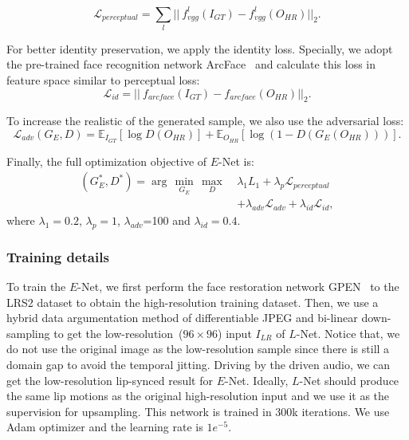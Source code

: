 \begin{equation}
\mathcal{L}_{perceptual} = \sum_l \vert\vert\ f_{vgg}^l(I_{GT}) - f_{vgg}^l(O_{HR})\vert\vert_2.
\end{equation}

For better identity preservation, we apply the identity loss. Specially, we adopt the pre-trained face recognition network ArcFace~\cite{deng2019arcface} and calculate this loss in feature space similar to perceptual loss:
\begin{equation}
\mathcal{L}_{id} = \vert\vert\ f_{arcface}(I_{GT}) - f_{arcface}(O_{HR})\vert\vert_2.
\end{equation}

To increase the realistic of the generated sample, we also use the adversarial loss:
\begin{equation}
\mathcal{L}_{adv}(G_E,D) = \mathbb{E}_{I_{GT}}[\log D(O_{HR})] + \mathbb{E}_{O_{HR}}[\log (1-D(G_E(O_{HR})))].
\end{equation}

Finally, the full optimization objective of $E$-Net is:
\begin{equation}
\begin{aligned}
(G^*_E, D^*) = \arg\,\min_{G_E}\,\max_D\ & \lambda_{1} L_{1} + \lambda_{p} \mathcal{L}_{perceptual} \\
&+ \lambda_{adv} \mathcal{L}_{adv} + \lambda_{id} \mathcal{L}_{id},
\end{aligned}
\end{equation}
\noindent where $\lambda_{1}=0.2$, $\lambda_{p}=1$, $\lambda_{adv}$=100 and $\lambda_{id}=0.4$.

\subsubsection{Training details}
To train the $E$-Net, we first perform the face restoration network GPEN~\cite{gpen} to the LRS2 dataset to obtain the high-resolution training dataset. 
Then, we use a hybrid data argumentation method of differentiable JPEG and bi-linear down-sampling to get the low-resolution~($96\times96$) input $I_{LR}$ of $L$-Net. Notice that, we do not use the original image as the low-resolution sample since there is still a domain gap to avoid the temporal jitting. Driving by the driven audio, we can get the low-resolution lip-synced result for $E$-Net. Ideally, $L$-Net should produce the same lip motions as the original high-resolution input and we use it as the supervision for upsampling. This network is trained in 300k iterations. We use Adam optimizer and the learning rate is $1e^{-5}$.


